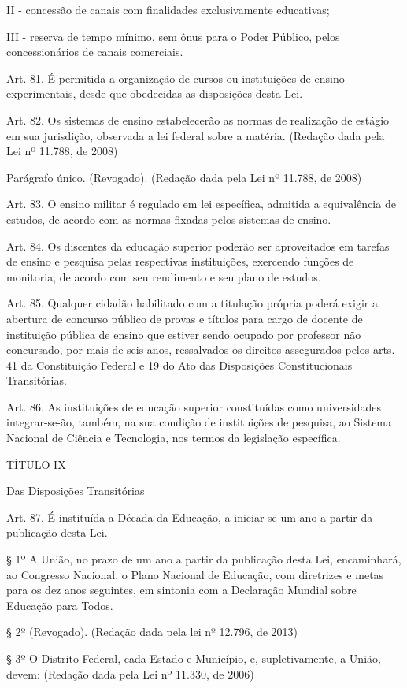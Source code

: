 \documentclass[
]{book}
\begin{document}
II - concessão de canais com finalidades exclusivamente educativas;

III - reserva de tempo mínimo, sem ônus para o Poder Público, pelos concessionários de canais comerciais.

Art. 81. É permitida a organização de cursos ou instituições de ensino experimentais, desde que obedecidas as disposições desta Lei.

Art. 82. Os sistemas de ensino estabelecerão as normas de realização de estágio em sua jurisdição, observada a lei federal sobre a matéria. (Redação dada pela Lei nº 11.788, de 2008)

Parágrafo único. (Revogado). (Redação dada pela Lei nº 11.788, de 2008)

Art. 83. O ensino militar é regulado em lei específica, admitida a equivalência de estudos, de acordo com as normas fixadas pelos sistemas de ensino.

Art. 84. Os discentes da educação superior poderão ser aproveitados em tarefas de ensino e pesquisa pelas respectivas instituições, exercendo funções de monitoria, de acordo com seu rendimento e seu plano de estudos.

Art. 85. Qualquer cidadão habilitado com a titulação própria poderá exigir a abertura de concurso público de provas e títulos para cargo de docente de instituição pública de ensino que estiver sendo ocupado por professor não concursado, por mais de seis anos, ressalvados os direitos assegurados pelos arts. 41 da Constituição Federal e 19 do Ato das Disposições Constitucionais Transitórias.

Art. 86. As instituições de educação superior constituídas como universidades integrar-se-ão, também, na sua condição de instituições de pesquisa, ao Sistema Nacional de Ciência e Tecnologia, nos termos da legislação específica.

TÍTULO IX

Das Disposições Transitórias

Art. 87. É instituída a Década da Educação, a iniciar-se um ano a partir da publicação desta Lei.

§ 1º A União, no prazo de um ano a partir da publicação desta Lei, encaminhará, ao Congresso Nacional, o Plano Nacional de Educação, com diretrizes e metas para os dez anos seguintes, em sintonia com a Declaração Mundial sobre Educação para Todos.

§ 2º (Revogado). (Redação dada pela lei nº 12.796, de 2013)

§ 3º O Distrito Federal, cada Estado e Município, e, supletivamente, a União, devem: (Redação dada pela Lei nº 11.330, de 2006)
\end{document}
